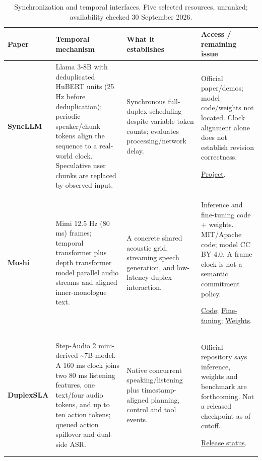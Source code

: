 \begin{table}[H]
\centering
\small
\setlength{\tabcolsep}{4pt}
\setlength{\tablewidth}{\dimexpr\linewidth-6\tabcolsep\relax}
\renewcommand{\arraystretch}{1.12}
\caption{Synchronization and temporal interfaces. Five selected resources, unranked; availability checked 30 September 2026.}
\label{tab:synchronization}
\begin{tabular}{@{}>{\raggedright\arraybackslash}p{0.22\tablewidth}>{\raggedright\arraybackslash}p{0.30\tablewidth}>{\raggedright\arraybackslash}p{0.27\tablewidth}>{\raggedright\arraybackslash}p{0.21\tablewidth}@{}}
\toprule
\textbf{Paper} & \textbf{Temporal mechanism} & \textbf{What it establishes} & \textbf{Access / remaining issue} \\
\midrule
\textbf{SyncLLM}\par\citep{syncllm} & Llama 3-8B with deduplicated HuBERT units (25 Hz before deduplication); periodic speaker/chunk tokens align the sequence to a real-world clock. Speculative user chunks are replaced by observed input. & Synchronous full-duplex scheduling despite variable token counts; evaluates processing/network delay. & Official paper/demos; model code/weights not located. Clock alignment alone does not establish revision correctness.\par \href{https://syncllm.cs.washington.edu/}{Project}. \\
\addlinespace[4pt]
\textbf{Moshi}\par\citep{moshi} & Mimi 12.5 Hz (80 ms) frames; temporal transformer plus depth transformer model parallel audio streams and aligned inner-monologue text. & A concrete shared acoustic grid, streaming speech generation, and low-latency duplex interaction. & Inference and fine-tuning code + weights. MIT/Apache code; model CC BY 4.0. A frame clock is not a semantic commitment policy.\par \href{https://github.com/kyutai-labs/moshi}{Code}; \href{https://github.com/kyutai-labs/moshi-finetune}{Fine-tuning}; \href{https://huggingface.co/kyutai/moshiko-pytorch-bf16}{Weights}. \\
\addlinespace[4pt]
\textbf{DuplexSLA}\par\citep{duplexsla} & Step-Audio 2 mini-derived \textasciitilde{}7B model. A 160 ms clock joins two 80 ms listening features, one text/four audio tokens, and up to ten action tokens; queued action spillover and dual-side ASR. & Native concurrent speaking/listening plus timestamp-aligned planning, control and tool events. & Official repository says inference, weights and benchmark are forthcoming. Not a released checkpoint as of cutoff.\par \href{https://github.com/hyzhang24/DuplexSLA}{Release status}. \\

\end{tabular}
\end{table}
